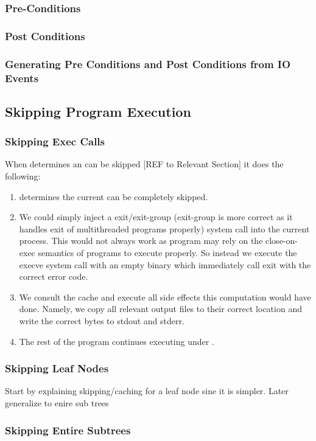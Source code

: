 \subsubsection{Pre-Conditions}

\subsubsection{Post Conditions}
\subsubsection{Generating Pre Conditions and Post Conditions from IO Events}
\subsection{Skipping Program Execution}
\subsubsection{Skipping Exec Calls}
When \pc determines an \cacheunit can be skipped [REF to Relevant Section] it does the following:
\begin{enumerate}
  \item \pc determines the current \cacheunit can be completely skipped.
  \item We could simply inject a exit/exit-group (exit-group is more correct as it handles exit of multithreaded programs properly) system call into the current process. This would not always work as program may rely on
  the close-on-exec semantics of programs to execute properly. So instead we execute the execve system call with an empty binary which immediately call exit with the correct error code.
  \item We consult the cache and execute all side effects this computation would have done. Namely, we copy all relevant output files to their correct location and write the correct bytes to stdout and stderr.
  \item The rest of the program continues executing under \pc.
\end{enumerate}

\subsubsection{Skipping Leaf Nodes}
Start by explaining skipping/caching for a leaf node sine it is simpler. Later generalize to enire sub trees
\subsubsection{Skipping Entire Subtrees}

